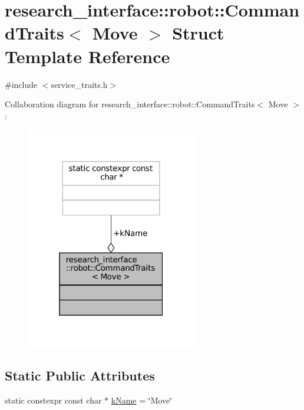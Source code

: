\hypertarget{structresearch__interface_1_1robot_1_1CommandTraits_3_01Move_01_4}{}\section{research\+\_\+interface\+:\+:robot\+:\+:Command\+Traits$<$ Move $>$ Struct Template Reference}
\label{structresearch__interface_1_1robot_1_1CommandTraits_3_01Move_01_4}


{\ttfamily \#include $<$service\+\_\+traits.\+h$>$}



Collaboration diagram for research\+\_\+interface\+:\+:robot\+:\+:Command\+Traits$<$ Move $>$\+:
\nopagebreak
\begin{figure}[H]
\begin{center}
\leavevmode
\includegraphics[width=211pt]{structresearch__interface_1_1robot_1_1CommandTraits_3_01Move_01_4__coll__graph}
\end{center}
\end{figure}
\subsection*{Static Public Attributes}
\begin{DoxyCompactItemize}
\item 
static constexpr const char $\ast$ \hyperlink{structresearch__interface_1_1robot_1_1CommandTraits_3_01Move_01_4_a8b66b8b529248114f90cb5350e06b0e7}{k\+Name} = \char`\"{}Move\char`\"{}
\end{DoxyCompactItemize}


